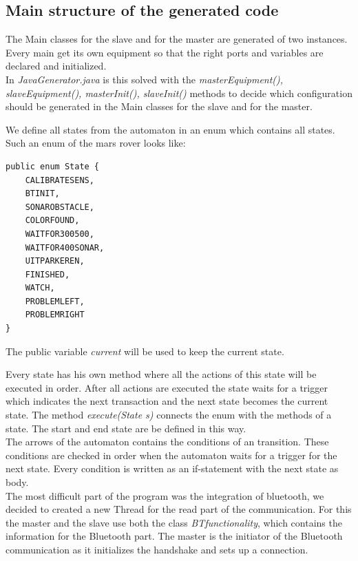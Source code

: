 \documentclass[11pt,a4paper]{article}
\begin{document}
\subsection{Main structure of the generated code}
The Main classes for the slave and for the master are generated of two instances. Every main get its own equipment so that the right ports and variables are declared and initialized. \\
In \emph{JavaGenerator.java} is this solved with the \emph{masterEquipment(), slaveEquipment(), masterInit(), slaveInit()} methods to decide which configuration should be generated in the Main classes for the slave and for the master. 

We define all states from the automaton in an enum which contains all states. Such an enum of the mars rover looks like: 
\begin{verbatim}
public enum State {
    CALIBRATESENS,
    BTINIT,
    SONAROBSTACLE,
    COLORFOUND,
    WAITFOR300500,
    WAITFOR400SONAR,
    UITPARKEREN,
    FINISHED,
    WATCH,
    PROBLEMLEFT,
    PROBLEMRIGHT
}
\end{verbatim}

The public variable \emph{current} will be used to keep the current state. 

Every state has his own method where all the actions of this state will be executed in order. After all actions are executed the state waits for a trigger which indicates the next transaction and the next state becomes the current state. 
The method \emph{execute(State s)} connects the enum with the methods of a state. The start and end state are be defined in this way. \\

The arrows of the automaton contains the conditions of an transition. These conditions are checked in order when the automaton waits for a trigger for the next state. Every condition is written as an if-statement with the next state as body. \\

The most difficult part of the program was the integration of bluetooth, we decided to created a new Thread for the read part of the communication. For this the master and the slave use both the class \emph{BTfunctionality}, which contains the information for the Bluetooth part. The master is the initiator of the Bluetooth communication as it initializes the handshake and sets up a connection. \\
\end{document}
